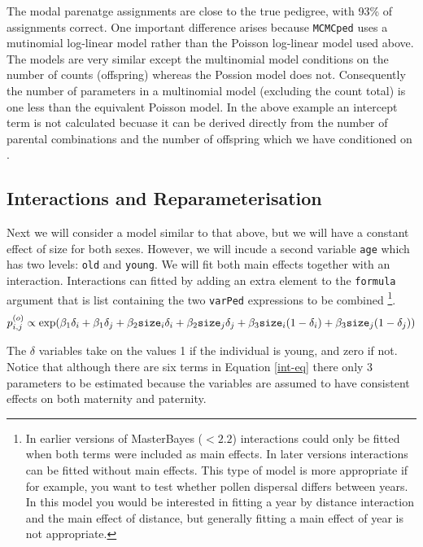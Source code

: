 \documentclass{article}
\begin{document}
The modal parenatge assignments are close to the true pedigree, with 93\% of assignments correct. One important difference arises because \texttt{MCMCped} uses a mutinomial log-linear model rather than the Poisson log-linear model used above.  The models are very similar except the multinomial model conditions on the number of counts (offspring) whereas the Possion model does not. Consequently the number of parameters in a multinomial model (excluding the count total) is one less than the equivalent Poisson model. In the above example an intercept term is not calculated becuase it can be derived directly from the number of parental combinations and the number of offspring which we have conditioned on \citep{McCullagh.1989}.  

\subsection{Interactions and Reparameterisation}

Next we will consider a model similar to that above, but we will have a constant effect of size for both sexes.  However, we will incude a second variable \texttt{age} which has two levels: \texttt{old} and \texttt{young}. We will fit both main effects together with an interaction.  Interactions can fitted by adding an extra element to the \texttt{formula} argument that is list containing the two \texttt{varPed} expressions to be combined \footnote{In earlier versions of MasterBayes ($<2.2$) interactions could only be fitted when both terms were included as main effects.  In later versions interactions can be fitted without main effects. This type of model is more appropriate if for example, you want to test whether pollen dispersal differs between years. In this model you would be interested in fitting a year by distance interaction and the main effect of distance, but generally fitting a main effect of year is not appropriate.}.\\

\begin{equation}
p^{(o)}_{i,j} \propto \textrm{exp}(\beta_{1}\delta_{i}+\beta_{1}\delta_{j}+\beta_{2}\textrm{\texttt{size}}_{i}\delta_{i}+\beta_{2}\textrm{\texttt{size}}_{j}\delta_{j}+\beta_{3}\textrm{\texttt{size}}_{i}(1-\delta_{i})+\beta_{3}\textrm{\texttt{size}}_{j}(1-\delta_{j}))
\label{int-eq}
\end{equation}

The $\delta$ variables take on the values 1 if the individual is young, and zero if not.  Notice that although there are six terms in Equation \ref{int-eq} there only 3 parameters to be estimated because the variables are assumed to have consistent effects on both maternity and paternity.   
\end{document}
